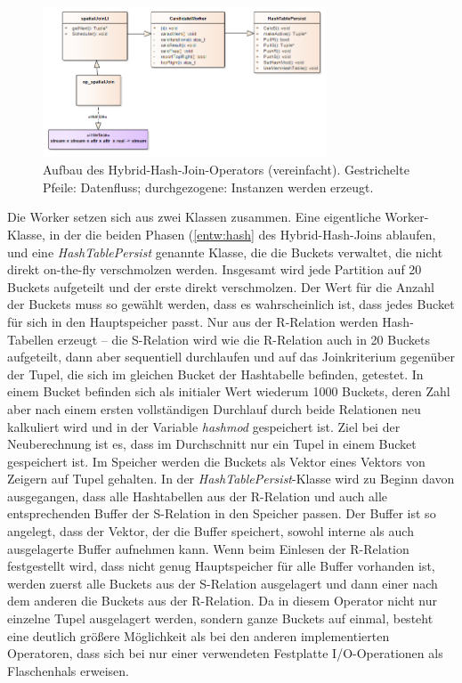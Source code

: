\documentclass[a4paper,12pt,twoside]{article}
\newcommand{\Fb}[1]{\textit{#1}} %
\begin{document}
\begin{figure}
	\centering
	\includegraphics[width=0.75\textwidth]{Bilder/hybridJoin.png}
	\caption{Aufbau des Hybrid-Hash-Join-Operators (vereinfacht). Gestrichelte Pfeile: Datenfluss; durchgezogene: Instanzen werden erzeugt.}
	\label{img:KlassJoin}
\end{figure}


Die Worker setzen sich aus zwei Klassen zusammen. Eine eigentliche Worker-Klasse, in der die beiden Phasen (\autoref{entw:hash} des Hybrid-Hash-Joins ablaufen, und eine \Fb{HashTablePersist} genannte Klasse, die die Buckets verwaltet, die nicht direkt on-the-fly verschmolzen werden. Insgesamt wird jede Partition auf 20 Buckets aufgeteilt und der erste direkt verschmolzen. Der Wert für die Anzahl der Buckets muss so gewählt werden, dass es wahrscheinlich ist, dass jedes Bucket für sich in den Hauptspeicher passt. Nur aus der R-Relation werden Hash-Tabellen erzeugt -- die S-Relation wird wie die R-Relation auch in 20 Buckets aufgeteilt, dann aber sequentiell durchlaufen und auf das Joinkriterium gegenüber der Tupel, die sich im gleichen Bucket der Hashtabelle befinden, getestet. In einem Bucket befinden sich als initialer Wert wiederum 1000 Buckets, deren Zahl aber nach einem ersten vollständigen Durchlauf durch beide Relationen neu kalkuliert wird und in der Variable \Fb{hashmod} gespeichert ist. Ziel bei der Neuberechnung ist es, dass im Durchschnitt nur ein Tupel in einem Bucket gespeichert ist. Im Speicher werden die Buckets als Vektor eines Vektors von Zeigern auf Tupel gehalten. In der \Fb{HashTablePersist}-Klasse wird zu Beginn davon ausgegangen, dass alle Hashtabellen aus der R-Relation und auch alle entsprechenden Buffer der S-Relation in den Speicher passen. Der Buffer ist so angelegt, dass der Vektor, der die Buffer speichert, sowohl interne als auch ausgelagerte Buffer aufnehmen kann. Wenn beim Einlesen der R-Relation festgestellt wird, dass nicht genug Hauptspeicher für alle Buffer vorhanden ist, werden zuerst alle Buckets aus der S-Relation ausgelagert und dann einer nach dem anderen die Buckets aus der R-Relation. Da in diesem Operator nicht nur einzelne Tupel ausgelagert werden, sondern ganze Buckets auf einmal, besteht eine deutlich größere Möglichkeit als bei den anderen implementierten Operatoren, dass sich bei nur einer verwendeten Festplatte I/O-Operationen als Flaschenhals erweisen. 
\end{document}

